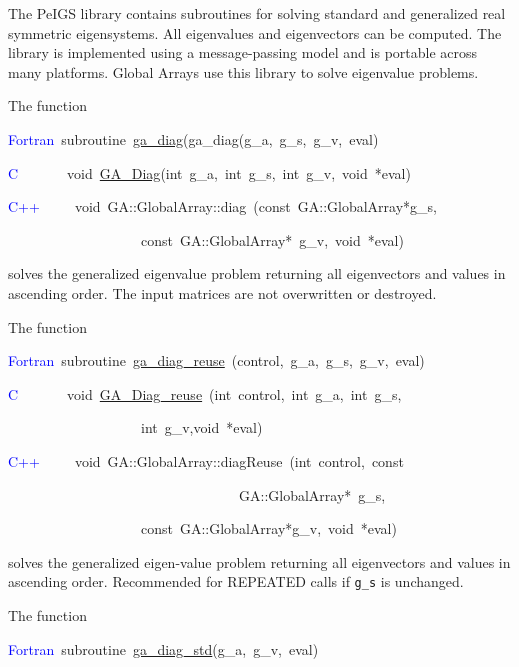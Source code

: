 The PeIGS library contains subroutines for solving standard and generalized
real symmetric eigensystems. All eigenvalues and eigenvectors can
be computed. The library is implemented using a message-passing model
and is portable across many platforms. 
Global Arrays use this library to solve eigenvalue problems.

The function

\textcolor{blue}{Fortran}~subroutine~\href{https://hpc.pnl.gov/globalarrays/api/f_op_api.html\#ga_diag}{ga\_{}diag}(ga\_diag(g\_a,~g\_s,~g\_v,~eval)~

\textcolor{blue}{C}~~~~~~~void~\href{https://hpc.pnl.gov/globalarrays/api/c_op_api.html\#ga_diag}{GA\_{}Diag}(int~g\_a,~int~g\_s,~int~g\_v,~void~{*}eval)

\textcolor{blue}{C++}~~~~~void~GA::GlobalArray::diag~(const~GA::GlobalArray{*}g\_s,~

~~~~~~~~~~~~~~~~~~~const~GA::GlobalArray{*}~g\_v,~void~{*}eval)

solves the generalized eigenvalue problem returning all eigenvectors
and values in ascending order. The input matrices are not overwritten
or destroyed.

The function

\textcolor{blue}{Fortran}~subroutine~\href{https://hpc.pnl.gov/globalarrays/api/f_op_api.html\#ga_diag_reuse}{ga\_{}diag\_{}reuse}~(control,~g\_a,~g\_s,~g\_v,~eval)~

\textcolor{blue}{C}~~~~~~~void~\href{https://hpc.pnl.gov/globalarrays/api/c_op_api.html\#ga_diag_reuse}{GA\_{}Diag\_{}reuse}~(int~control,~int~g\_a,~int~g\_s,

~~~~~~~~~~~~~~~~~~~int~g\_v,void~{*}eval)~

\textcolor{blue}{C++}~~~~~void~GA::GlobalArray::diagReuse~(int~control,~const

~~~~~~~~~~~~~~~~~~~~~~~~~~~~~~~~~GA::GlobalArray{*}~g\_s,~~~~~

~~~~~~~~~~~~~~~~~~~const~GA::GlobalArray{*}g\_v,~void~{*}eval)

solves the generalized eigen-value problem returning all eigenvectors
and values in ascending order. Recommended for REPEATED calls if \texttt{g\_s}
is unchanged.

The function

\textcolor{blue}{Fortran}~subroutine~\href{https://hpc.pnl.gov/globalarrays/api/f_op_api.html\#ga_diag_std}{ga\_{}diag\_{}std}(g\_a,~g\_v,~eval)~

